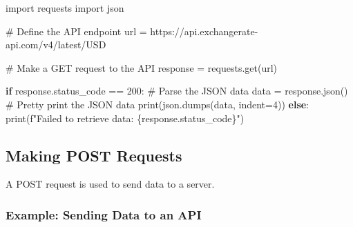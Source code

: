 \documentclass[
  letterpaper,
  DIV=11,
  numbers=noendperiod]{scrreprt}
\newenvironment{Shaded}{\begin{snugshade}}{\end{snugshade}}
\newcommand{\BuiltInTok}[1]{\textcolor[rgb]{0.00,0.23,0.31}{#1}}
\newcommand{\CommentTok}[1]{\textcolor[rgb]{0.37,0.37,0.37}{#1}}
\newcommand{\ControlFlowTok}[1]{\textcolor[rgb]{0.00,0.23,0.31}{\textbf{#1}}}
\newcommand{\DecValTok}[1]{\textcolor[rgb]{0.68,0.00,0.00}{#1}}
\newcommand{\ImportTok}[1]{\textcolor[rgb]{0.00,0.46,0.62}{#1}}
\newcommand{\NormalTok}[1]{\textcolor[rgb]{0.00,0.23,0.31}{#1}}
\newcommand{\OperatorTok}[1]{\textcolor[rgb]{0.37,0.37,0.37}{#1}}
\newcommand{\SpecialCharTok}[1]{\textcolor[rgb]{0.37,0.37,0.37}{#1}}
\newcommand{\SpecialStringTok}[1]{\textcolor[rgb]{0.13,0.47,0.30}{#1}}
\newcommand{\StringTok}[1]{\textcolor[rgb]{0.13,0.47,0.30}{#1}}
\begin{document}
\begin{Shaded}
\begin{Highlighting}[]
\ImportTok{import}\NormalTok{ requests}
\ImportTok{import}\NormalTok{ json}

\CommentTok{\# Define the API endpoint}
\NormalTok{url }\OperatorTok{=} \StringTok{\textquotesingle{}https://api.exchangerate{-}api.com/v4/latest/USD\textquotesingle{}}

\CommentTok{\# Make a GET request to the API}
\NormalTok{response }\OperatorTok{=}\NormalTok{ requests.get(url)}

\ControlFlowTok{if}\NormalTok{ response.status\_code }\OperatorTok{==} \DecValTok{200}\NormalTok{:}
    \CommentTok{\# Parse the JSON data}
\NormalTok{    data }\OperatorTok{=}\NormalTok{ response.json()}
    \CommentTok{\# Pretty print the JSON data}
    \BuiltInTok{print}\NormalTok{(json.dumps(data, indent}\OperatorTok{=}\DecValTok{4}\NormalTok{))}
\ControlFlowTok{else}\NormalTok{:}
    \BuiltInTok{print}\NormalTok{(}\SpecialStringTok{f"Failed to retrieve data: }\SpecialCharTok{\{}\NormalTok{response}\SpecialCharTok{.}\NormalTok{status\_code}\SpecialCharTok{\}}\SpecialStringTok{"}\NormalTok{)}
\end{Highlighting}
\end{Shaded}

\subsection{Making POST Requests}\label{making-post-requests}

A POST request is used to send data to a server.

\subsubsection{Example: Sending Data to an
API}\label{example-sending-data-to-an-api}
\end{document}
